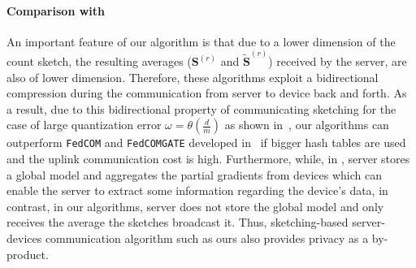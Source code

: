 \documentclass[twoside]{article}
\begin{document}
\paragraph{Comparison  with~\cite{haddadpour2020federated}}\label{rmrk:bidirect}
An important feature of our algorithm is that due to a lower dimension of the count sketch, the resulting averages ($\mathbf{S}^{(r)}$ and  $\tilde{\mathbf{S}}^{(r)}$) received by the server, are also of lower dimension. 
Therefore, these algorithms exploit a bidirectional compression during the communication from server to device back and forth. 
As a result, due to this bidirectional property of communicating sketching for the case of large quantization error $\omega=\theta(\frac{d}{m})$ as shown in~\cite{haddadpour2020federated}, our algorithms can outperform \texttt{FedCOM} and \texttt{FedCOMGATE} developed in~\cite{haddadpour2020federated} if bigger hash tables are used and the uplink communication cost is high. 
Furthermore, while, in \cite{haddadpour2019convergence}, server stores a global model and aggregates the partial gradients from devices which can enable the server to extract some information regarding the device's data, in contrast, in our algorithms, server does not store the global model and only receives the average the sketches broadcast it. 
Thus, sketching-based server-devices communication algorithm such as ours also provides privacy as a by-product.
\end{document}
